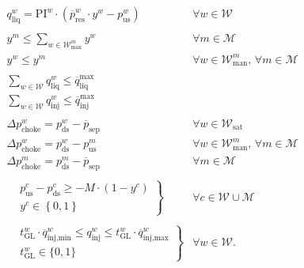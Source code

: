 \documentclass[pdflatex,sn-mathphys-num]{sn-jnl}%
\begin{document}
\begin{subequations}
\begin{align}
    & q_{\text{liq}}^{w} = \text{PI}^{w} \cdot  ( \overline{p}_{\text{res}}^{w} \cdot y^{w} - p_{\text{us}}^{w}) & \forall w \in \mathcal{W} \label{eq:oil-model-c5} \\
    \nonumber\\
   & y^m \le \sum_{w\in \mathcal{W}_{\text{man}}^{m}} y^w & \forall m\in \mathcal{M} \label{eq:oil-model-c12a} \\
   & y^w \leq  y^m & \forall w\in \mathcal{W}_{\text{man}}^{m} ,\,\forall m\in \mathcal{M} \label{eq:oil-model-c12b} \\
    \nonumber\\
	& \sum_{w\in \mathcal{W}} q_{\text{liq}}^{w} \le \overline{q}_{\text{liq}}^{\text{max}} & \label{eq:oil-model-c6a} \\
	& \sum_{w\in \mathcal{W}} q_{\text{inj}}^{w} \le \overline{q}_{\text{inj}}^{\text{max}} & \label{eq:oil-model-c6b} \\
    \nonumber\\
    & \Delta p_{\text{choke}}^{w} = p_{\text{ds}}^{w} - \overline{p}_{\text{sep}} & \forall w\in \mathcal{W}_{\text{sat}} \label{eq:oil-model-c7} \\
    & \Delta p_{\text{choke}}^{w} = p_{\text{ds}}^{w} - p_{\text{us}}^{m} & \forall w\in \mathcal{W}_{\text{man}}^{m},\,\forall m\in \mathcal{M} \label{eq:oil-model-c8} \\
    & \Delta p_{\text{choke}}^{m} = p_{\text{ds}}^{m} - \overline{p}_{\text{sep}} & \forall m\in \mathcal{M} \label{eq:oil-model-c9} \\
    \nonumber\\
  &  \left . \begin{aligned}
	& p_{\text{us}}^{c} - p_{\text{ds}}^{c} \ge -M \cdot (1-y^{c}) \\
	& y^{c} \in \left\{ 0,1 \right\} 
    \end{aligned} \right \} & \forall c \in \mathcal{W}\cup \mathcal{M} \label{eq:oil-model-c10}  \\
    \nonumber\\
    & \left . \begin{aligned}
    & t_{\text{GL}}^w\cdot \overline{q}_{\text{inj,min}}^w \le q_{\text{inj}}^{w} \le t_{\text{GL}}^w\cdot \overline{q}_{\text{inj,max}}^w  \\
    & t_{\text{GL}}^w \in \{0,1\} 
    \end{aligned} \right \} & \forall w \in \mathcal{W} \label{eq:oil-model-c11}
.\end{align}
\end{subequations}
\end{document}
